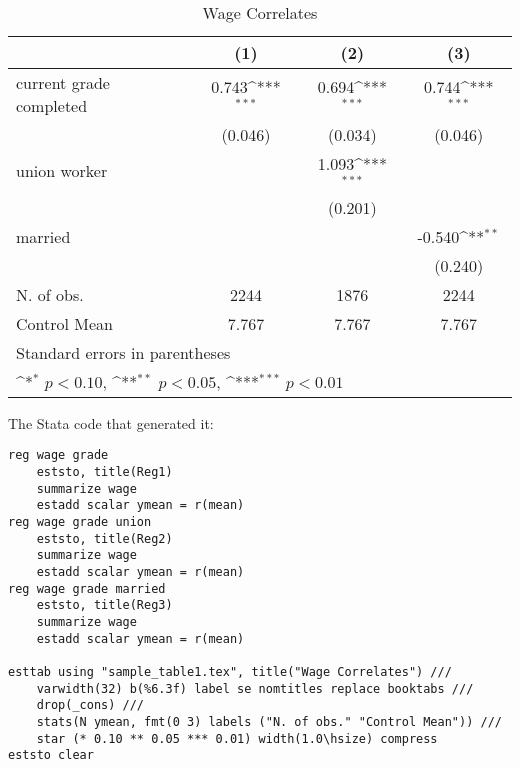 \documentclass{article}
\begin{document}
\begin{table}[htbp]\centering
	\def\sym#1{\ifmmode^{#1}\else\(^{#1}\)\fi}
	\caption{Wage Correlates}
	\begin{tabular*}{1.0\hsize}{@{\hskip\tabcolsep\extracolsep\fill}l*{3}{c}}
		\toprule
		&\multicolumn{1}{c}{(1)}         &\multicolumn{1}{c}{(2)}         &\multicolumn{1}{c}{(3)}         \\
		\midrule
		current grade completed         &    0.743\sym{***}&    0.694\sym{***}&    0.744\sym{***}\\
		&  (0.046)         &  (0.034)         &  (0.046)         \\
		\addlinespace
		union worker                    &                  &    1.093\sym{***}&                  \\
		&                  &  (0.201)         &                  \\
		\addlinespace
		married                         &                  &                  &   -0.540\sym{**} \\
		&                  &                  &  (0.240)         \\
		\midrule
		N. of obs.                      &     2244         &     1876         &     2244         \\
		Control Mean                    &    7.767         &    7.767         &    7.767         \\
		\bottomrule
		\multicolumn{4}{l}{\footnotesize Standard errors in parentheses}\\
		\multicolumn{4}{l}{\footnotesize \sym{*} \(p<0.10\), \sym{**} \(p<0.05\), \sym{***} \(p<0.01\)}\\
	\end{tabular*}
\end{table}

The Stata code that generated it:
\begin{verbatim}
reg wage grade
	eststo, title(Reg1)
	summarize wage
	estadd scalar ymean = r(mean)
reg wage grade union
	eststo, title(Reg2)
	summarize wage
	estadd scalar ymean = r(mean)
reg wage grade married
	eststo, title(Reg3)
	summarize wage
	estadd scalar ymean = r(mean)
	
esttab using "sample_table1.tex", title("Wage Correlates") ///
	varwidth(32) b(%6.3f) label se nomtitles replace booktabs ///
	drop(_cons) ///
	stats(N ymean, fmt(0 3) labels ("N. of obs." "Control Mean")) ///
	star (* 0.10 ** 0.05 *** 0.01) width(1.0\hsize) compress
eststo clear
\end{verbatim}
\end{document}
